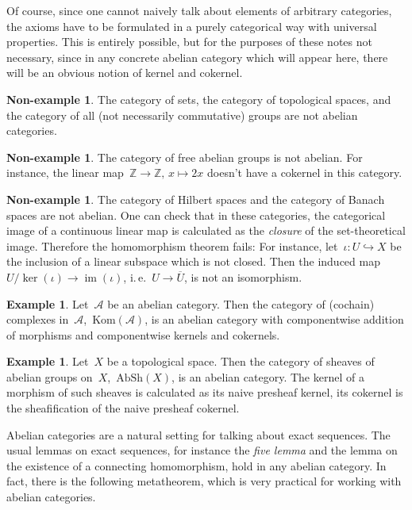 \documentclass{amsart}
\makeatletter
\theoremstyle{definition}
\newtheorem{ex}[defn]{Example}
\newtheorem{non-ex}[defn]{Non-example}
\theoremstyle{plain}
\theoremstyle{remark}
\newcommand{\ZZ}{\mathbb{Z}}
\newcommand{\A}{\mathcal{A}}
\newcommand{\Kom}{\mathrm{Kom}}
\newcommand{\AbSh}{\mathrm{AbSh}}
\DeclareMathOperator{\Image}{im}
\DeclareMathOperator{\Kernel}{ker}
\newcommand{\?}{\,{:}\,}
\renewcommand{\_}{\mathpunct{.}\,}
\newcommand{\ie}{i.\,e.\@\xspace}
\makeatother
\begin{document}
Of course, since one cannot naively talk about elements of arbitrary
categories, the axioms have to be formulated in a purely categorical way with
universal properties. This is entirely possible, but for the purposes of these
notes not necessary, since in any concrete abelian category which will appear here,
there will be an obvious notion of kernel and cokernel.

\begin{non-ex}The category of sets, the category of topological spaces, and the
category of all (not necessarily commutative) groups are not abelian
categories.\end{non-ex}

\begin{non-ex}The category of free abelian groups is not abelian. For instance,
the linear map~$\ZZ \to \ZZ,\,x \mapsto 2x$ doesn't have a cokernel in this
category.\end{non-ex}

\begin{non-ex}The category of Hilbert spaces and the category of Banach spaces
are not abelian. One can check that in these categories, the categorical image
of a continuous linear map is calculated as the \emph{closure} of the
set-theoretical image. Therefore the homomorphism theorem fails: For instance,
let~$\iota : U \hookrightarrow X$ be the inclusion of a linear subspace which is
not closed. Then the induced map~$U/\Kernel(\iota) \to \Image(\iota)$, \ie~$U
\to \overline{U}$, is not an isomorphism.
\end{non-ex}

\begin{ex}Let~$\A$ be an abelian category. Then the category of (cochain)
complexes in~$\A$,~$\Kom(\A)$, is an abelian category with componentwise
addition of morphisms and componentwise kernels and cokernels.\end{ex}

\begin{ex}Let~$X$ be a topological space. Then the category of sheaves of
abelian groups on~$X$,~$\AbSh(X)$, is an abelian category. The kernel of a
morphism of such sheaves is calculated as its naive presheaf kernel, its
cokernel is the sheafification of the naive presheaf cokernel.\end{ex}

Abelian categories are a natural setting for talking about exact sequences. The
usual lemmas on exact sequences, for instance the \emph{five lemma} and the
lemma on the existence of a connecting homomorphism, hold in any abelian
category. In fact, there is the following metatheorem, which is very practical
for working with abelian categories.
\end{document}
